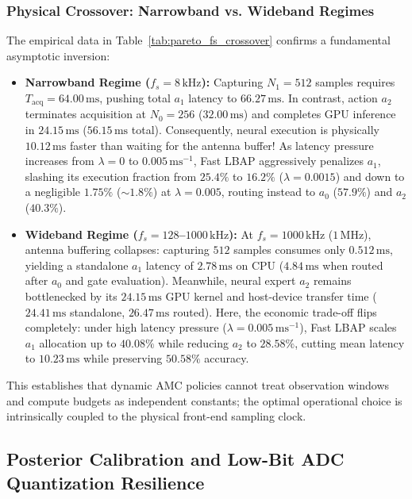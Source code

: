 \subsubsection{Physical Crossover: Narrowband vs. Wideband Regimes}
The empirical data in Table~\ref{tab:pareto_fs_crossover} confirms a fundamental asymptotic inversion:
\begin{itemize}
    \item \textbf{Narrowband Regime ($f_s = 8\,\mathrm{kHz}$):} Capturing $N_1 = 512$ samples requires $T_{\mathrm{acq}} = 64.00\,\mathrm{ms}$, pushing total $a_1$ latency to $66.27\,\mathrm{ms}$. In contrast, action $a_2$ terminates acquisition at $N_0 = 256$ ($32.00\,\mathrm{ms}$) and completes GPU inference in $24.15\,\mathrm{ms}$ ($56.15\,\mathrm{ms}$ total). Consequently, neural execution is physically $10.12\,\mathrm{ms}$ faster than waiting for the antenna buffer! As latency pressure increases from $\lambda = 0$ to $0.005\,\mathrm{ms}^{-1}$, Fast LBAP aggressively penalizes $a_1$, slashing its execution fraction from $25.4\%$ to $16.2\%$ ($\lambda=0.0015$) and down to a negligible $1.75\%$ ($\sim 1.8\%$) at $\lambda=0.005$, routing instead to $a_0$ ($57.9\%$) and $a_2$ ($40.3\%$).
    
    \item \textbf{Wideband Regime ($f_s = 128$--$1000\,\mathrm{kHz}$):} At $f_s = 1000\,\mathrm{kHz}$ ($1\,\mathrm{MHz}$), antenna buffering collapses: capturing $512$ samples consumes only $0.512\,\mathrm{ms}$, yielding a standalone $a_1$ latency of $2.78\,\mathrm{ms}$ on CPU ($4.84\,\mathrm{ms}$ when routed after $a_0$ and gate evaluation). Meanwhile, neural expert $a_2$ remains bottlenecked by its $24.15\,\mathrm{ms}$ GPU kernel and host-device transfer time ($24.41\,\mathrm{ms}$ standalone, $26.47\,\mathrm{ms}$ routed). Here, the economic trade-off flips completely: under high latency pressure ($\lambda = 0.005\,\mathrm{ms}^{-1}$), Fast LBAP scales $a_1$ allocation up to $\mathbf{40.08\%}$ while reducing $a_2$ to $28.58\%$, cutting mean latency to $10.23\,\mathrm{ms}$ while preserving $50.58\%$ accuracy.
\end{itemize}

This establishes that dynamic AMC policies cannot treat observation windows and compute budgets as independent constants; the optimal operational choice is intrinsically coupled to the physical front-end sampling clock.

\subsection{Posterior Calibration and Low-Bit ADC Quantization Resilience}
\label{subsec:calibration_adc_resilience}

